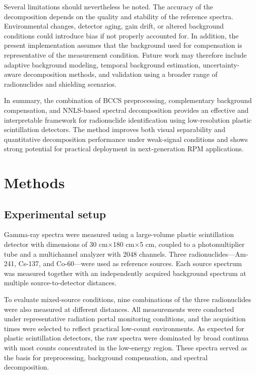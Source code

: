 \documentclass[fleqn, 10pt]{wlscirep}
\begin{document}
Several limitations should nevertheless be noted. The accuracy of the decomposition depends on the quality and stability of the reference spectra. Environmental changes, detector aging, gain drift, or altered background conditions could introduce bias if not properly accounted for. In addition, the present implementation assumes that the background used for compensation is representative of the measurement condition. Future work may therefore include adaptive background modeling, temporal background estimation, uncertainty-aware decomposition methods, and validation using a broader range of radionuclides and shielding scenarios.

In summary, the combination of BCCS preprocessing, complementary background compensation, and NNLS-based spectral decomposition provides an effective and interpretable framework for radionuclide identification using low-resolution plastic scintillation detectors. The method improves both visual separability and quantitative decomposition performance under weak-signal conditions and shows strong potential for practical deployment in next-generation RPM applications.


\section*{Methods}
\subsection*{Experimental setup}

Gamma-ray spectra were measured using a large-volume plastic scintillation detector with dimensions of 30 cm$\times$180 cm$\times$5 cm, coupled to a photomultiplier tube and a multichannel analyzer with 2048 channels. Three radionuclides—Am-241, Cs-137, and Co-60—were used as reference sources. Each source spectrum was measured together with an independently acquired background spectrum at multiple source-to-detector distances.

To evaluate mixed-source conditions, nine combinations of the three radionuclides were also measured at different distances. All measurements were conducted under representative radiation portal monitoring conditions, and the acquisition times were selected to reflect practical low-count environments. As expected for plastic scintillation detectors, the raw spectra were dominated by broad continua with most counts concentrated in the low-energy region. These spectra served as the basis for preprocessing, background compensation, and spectral decomposition.
\end{document}

